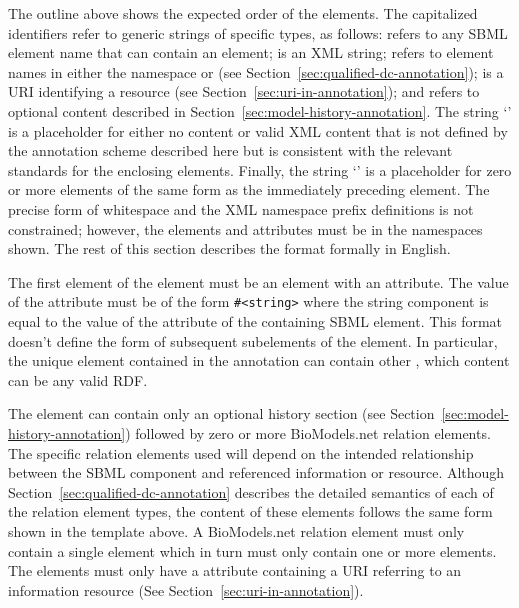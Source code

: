 The outline above shows the expected order of the elements.  The
capitalized identifiers refer to generic strings of specific
types, as follows: \sbmlElement refers to any SBML element name
that can contain an  element; \sbmlMeta is an
XML  string; \relationElement refers to element names
in either the namespace
{}
or {}
(see Section~\ref{sec:qualified-dc-annotation}); \resourceURI is a
URI identifying a resource (see
Section~\ref{sec:uri-in-annotation}); and \history refers to
optional content described in
Section~\ref{sec:model-history-annotation}.  The string
`\otherContent' is a placeholder for either no content or valid
XML content that is not defined by the annotation scheme described
here but is consistent with the relevant standards for the
enclosing elements.  Finally, the string `\moreOfTheSame' is a
placeholder for zero or more elements of the same form as the
immediately preceding element.  The precise form of whitespace and
the XML namespace prefix definitions is not constrained; however,
the elements and attributes must be in the namespaces shown. The
rest of this section describes the format formally in English.

The first element of the  element must be an
 element with an 
attribute. The value of the
 attribute must be of the form
\texttt{\#<string>} where the string component is equal to the
value of the  attribute of the containing SBML element.
This format doesn't define the form of subsequent
subelements of the  element. In particular, the unique  element contained in the annotation can contain other , which content can be any valid RDF.

The  element can contain only an optional
history section (see Section~\ref{sec:model-history-annotation})
followed by zero or more BioModels.net relation elements.  The
specific relation elements used will depend on the intended
relationship between the SBML component and referenced information
or resource.  Although Section~\ref{sec:qualified-dc-annotation}
describes the detailed semantics of each of the relation element
types, the content of these elements follows the same form shown
in the template above.  A BioModels.net relation element must only
contain a single  element which in turn must only
contain one or more  elements.  The 
elements must only have a  attribute
containing a URI referring to an information resource (See
Section~\ref{sec:uri-in-annotation}).

